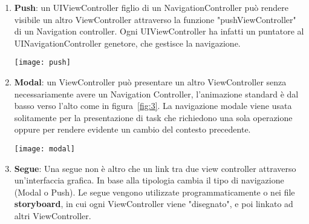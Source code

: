 \begin{enumerate}
    \item{\textbf{Push}: un UIViewController figlio di un NavigationController può rendere
    visibile un altro ViewController attraverso la funzione 
    "pushViewController" di un Navigation controller. Ogni UIViewController ha
    infatti un puntatore al UINavigationController genetore, che gestisce la navigazione.

    \par
    \begin{minipage}{\linewidth}
        \centering
        \texttt{[image: push]}
        \label{fig:2}
    \end{minipage}
    }
    \item{ \textbf{Modal}: un ViewController può presentare un altro ViewController senza necessariamente avere un 
        Navigation Controller, l'animazione standard è dal basso verso l'alto come in figura~\ref{fig:3}. La navigazione modale viene
        usata solitamente per la presentazione di task che richiedono una sola operazione oppure per rendere evidente un cambio del contesto precedente.
        \par
        \begin{minipage}{\linewidth}
            \centering
            \texttt{[image: modal]}
            \label{fig:3}
        \end{minipage}
    }
    \item{\textbf{Segue}: Una segue non è altro che un link tra due view controller attraverso un'interfaccia
        grafica. In base alla tipologia cambia il tipo di navigazione (Modal o Push). Le segue vengono utilizzate programmaticamente o nei file \textbf{storyboard}, in cui
        ogni ViewController viene "disegnato", e poi linkato ad altri ViewController.
    }
\end{enumerate}




